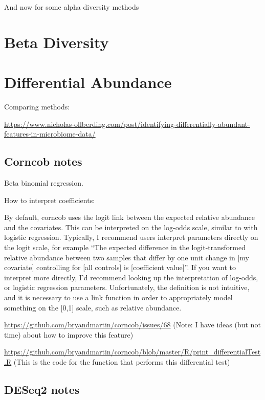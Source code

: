 \documentclass[
]{book}
\begin{document}
And now for some alpha diversity methods

\hypertarget{beta-diversity}{%
\chapter{Beta Diversity}\label{beta-diversity}}

\hypertarget{differential-abundance}{%
\chapter{Differential Abundance}\label{differential-abundance}}

Comparing methods:

\url{https://www.nicholas-ollberding.com/post/identifying-differentially-abundant-features-in-microbiome-data/}

\hypertarget{corncob-notes}{%
\section{Corncob notes}\label{corncob-notes}}

Beta binomial regression.

How to interpret coefficients:

By default, corncob uses the logit link between the expected relative abundance and the covariates. This can be interpreted on the log-odds scale, similar to with logistic regression. Typically, I recommend users interpret parameters directly on the logit scale, for example ``The expected difference in the logit-transformed relative abundance between two samples that differ by one unit change in {[}my covariate{]} controlling for {[}all controls{]} is {[}coefficient value{]}''. If you want to interpret more directly, I'd recommend looking up the interpretation of log-odds, or logistic regression parameters. Unfortunately, the definition is not intuitive, and it is necessary to use a link function in order to appropriately model something on the {[}0,1{]} scale, such as relative abundance.

\url{https://github.com/bryandmartin/corncob/issues/68}
(Note: I have ideas (but not time) about how to improve this feature)

\url{https://github.com/bryandmartin/corncob/blob/master/R/print_differentialTest.R}
(This is the code for the function that performs this differential test)

\hypertarget{deseq2-notes}{%
\section{DESeq2 notes}\label{deseq2-notes}}
\end{document}
